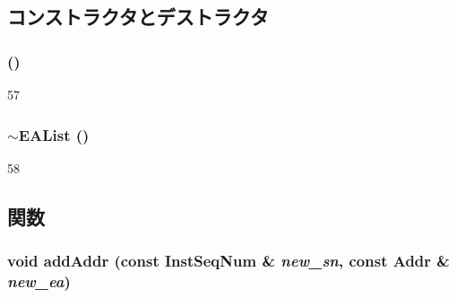 \subsection{コンストラクタとデストラクタ}
\hypertarget{classEAList_a46333c3216a1f17c75fca96b2ab6dc7a}{
\subsubsection[{EAList}]{ ()}}
\label{classEAList_a46333c3216a1f17c75fca96b2ab6dc7a}



\begin{DoxyCode}
57 { }
\end{DoxyCode}
\hypertarget{classEAList_a73d890a1090a402397e5a7657a5b3e29}{
\subsubsection[{$\sim$EAList}]{\setlength{\rightskip}{0pt plus 5cm}$\sim${\bf EAList} ()}}
\label{classEAList_a73d890a1090a402397e5a7657a5b3e29}



\begin{DoxyCode}
58 { }
\end{DoxyCode}


\subsection{関数}
\hypertarget{classEAList_a868bd0f41fcbdea9e0a8e85d962a5f8e}{
\subsubsection[{addAddr}]{\setlength{\rightskip}{0pt plus 5cm}void addAddr (const {\bf InstSeqNum} \& {\em new\_\-sn}, \/  const {\bf Addr} \& {\em new\_\-ea})}}
\label{classEAList_a868bd0f41fcbdea9e0a8e85d962a5f8e}



